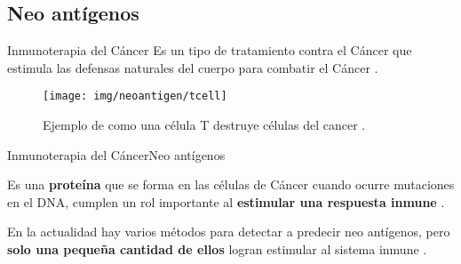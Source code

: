 \documentclass[10pt]{beamer}
\newcommand{\1}{
	\setbeamertemplate{background}{
		\texttt{[image: img/1]}
		\tikz[overlay] \fill[fill opacity=0.75,fill=white] (0,0) rectangle (-\paperwidth,\paperheight);
	}
}
\begin{document}
\subsection{Neo antígenos}


\begin{frame}{Inmunoterapia del Cáncer}{}		
	Es un tipo de tratamiento contra el Cáncer que estimula las defensas naturales del cuerpo para combatir el Cáncer \cite{inmunoterapy2022}.
		
	\begin{figure}
		\texttt{[image: img/neoantigen/tcell]}
		\caption{Ejemplo de como una célula T destruye células del cancer \cite{nortshore2022}.}
	\end{figure}		
\end{frame}

\begin{frame}{Inmunoterapia del Cáncer}{Neo antígenos}		
	\begin{block}{}
		Es una \textbf{proteína} que se forma en las células de Cáncer cuando ocurre mutaciones en el DNA, cumplen un rol importante al \textbf{estimular una respuesta inmune} \cite{NCIdictionary2022, borden2022cancer}.
	\end{block} 
	\begin{block}{}
		En la actualidad hay varios métodos para detectar a predecir neo antígenos, pero \textbf{solo una pequeña cantidad de ellos} logran estimular al sistema inmune \cite{chen2021challenges, hao2021improvement}.
	\end{block}
\end{frame}
\end{document}
